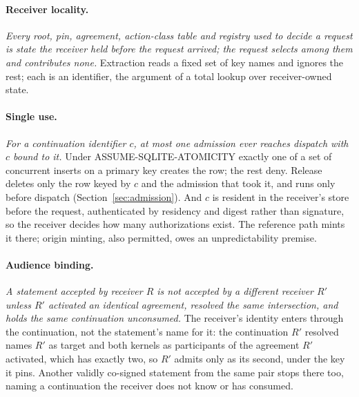 \paragraph{Receiver locality.}
\emph{Every root, pin, agreement, action-class table and registry used to decide
a request is state the receiver held before the request arrived; the request
selects among them and contributes none.}
Extraction reads a fixed set of key names and ignores the rest; each is an
identifier, the argument of a total lookup over receiver-owned state.

\paragraph{Single use.}
\emph{For a continuation identifier $c$, at most one admission ever reaches
dispatch with $c$ bound to it.}
Under ASSUME-SQLITE-ATOMICITY exactly one of a set of concurrent inserts on a
primary key creates the row; the rest deny. Release deletes only the row
keyed by $c$ and the admission that took it, and runs only before dispatch
(Section~\ref{sec:admission}). And $c$ is resident in the receiver's store
before the request, authenticated by residency and digest rather than signature,
so the receiver decides how many authorizations exist. The reference
path mints it there; origin minting, also permitted, owes an
unpredictability premise.

\paragraph{Audience binding.}
\emph{A statement accepted by receiver $R$ is not accepted by a different
receiver $R'$ unless $R'$ activated an identical agreement, resolved the same
intersection, and holds the same continuation unconsumed.}
The receiver's identity enters through the continuation, not the statement's
name for it: the continuation $R'$ resolved names $R'$ as target and both
kernels as participants of the agreement $R'$ activated, which has exactly two,
so $R'$ admits only as its second, under the key it pins. Another
validly co-signed statement from the same pair stops there too, naming a
continuation the receiver does not know or has consumed.

